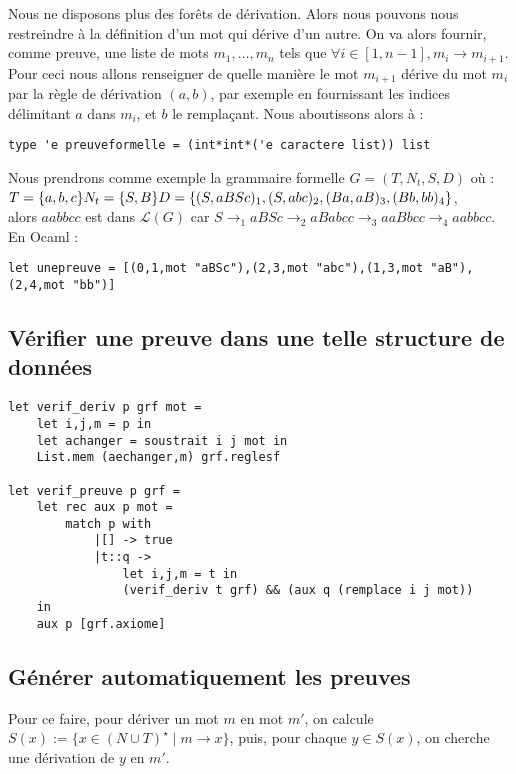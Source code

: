 \documentclass[a4paper,10pt
]{article}
\begin{document}
Nous ne disposons plus des forêts de dérivation. Alors nous pouvons nous restreindre à la définition d'un mot qui dérive d'un autre.
On va alors fournir, comme preuve, une liste de mots $m_1, \dots, m_n$ tels que $\forall i\in [1,n-1], m_i \rightarrow m_{i+1}$. 
Pour ceci nous allons renseigner de quelle manière le mot $m_{i+1}$ dérive du mot $m_i$ par la règle de dérivation $(a,b)$, par exemple en fournissant les indices délimitant $a$ dans $m_i$, et $b$ le remplaçant.
Nous aboutissons alors à :
\begin{verbatim}
type 'e preuveformelle = (int*int*('e caractere list)) list
\end{verbatim}

Nous prendrons comme exemple la grammaire formelle $G = (T,N_t,S,D)$ où :\\
$
T = \{a,b,c\}\\
N_t = \{S,B\}\\
D = \{(S,aBSc)_1,(S,abc)_2,(Ba,aB)_3,(Bb,bb)_4\}
$,\\
alors $aabbcc$ est dans $\mathcal{L}(G)$ car $S \rightarrow_1 aBSc \rightarrow_2 aBabcc \rightarrow_3 aaBbcc \rightarrow_4 aabbcc$.\\
En Ocaml :
\begin{verbatim}
let unepreuve = [(0,1,mot "aBSc"),(2,3,mot "abc"),(1,3,mot "aB"),(2,4,mot "bb")]
\end{verbatim}

\subsection{Vérifier une preuve dans une telle structure de données}

\begin{verbatim}
let verif_deriv p grf mot = 
    let i,j,m = p in
    let achanger = soustrait i j mot in
    List.mem (aechanger,m) grf.reglesf

let verif_preuve p grf = 
    let rec aux p mot = 
        match p with
            |[] -> true
            |t::q -> 
                let i,j,m = t in
                (verif_deriv t grf) && (aux q (remplace i j mot))
    in 
    aux p [grf.axiome]

\end{verbatim}

\subsection{Générer automatiquement les preuves}

Pour ce faire, pour dériver un mot $m$ en mot $m'$, on calcule $S(x) := \{x \in (N\cup T)^\star \mid m \rightarrow x\}$,
puis, pour chaque $ y \in S(x)$, on cherche une dérivation de $y$ en $m'$.
\end{document}
